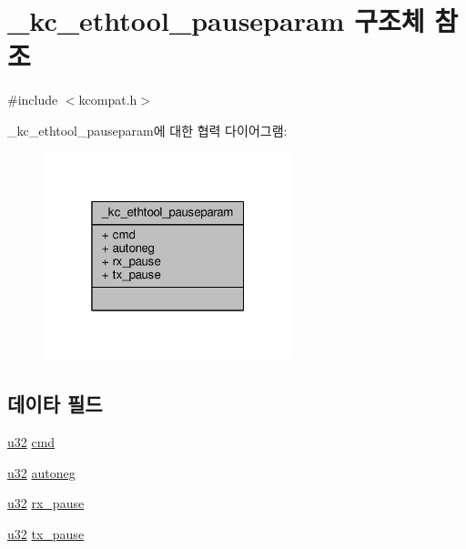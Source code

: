 \hypertarget{struct__kc__ethtool__pauseparam}{}\section{\+\_\+kc\+\_\+ethtool\+\_\+pauseparam 구조체 참조}
\label{struct__kc__ethtool__pauseparam}


{\ttfamily \#include $<$kcompat.\+h$>$}



\+\_\+kc\+\_\+ethtool\+\_\+pauseparam에 대한 협력 다이어그램\+:
\nopagebreak
\begin{figure}[H]
\begin{center}
\leavevmode
\includegraphics[width=205pt]{struct__kc__ethtool__pauseparam__coll__graph}
\end{center}
\end{figure}
\subsection*{데이타 필드}
\begin{DoxyCompactItemize}
\item 
\hyperlink{lib_2igb_2e1000__osdep_8h_a64e91c10a0d8fb627e92932050284264}{u32} \hyperlink{struct__kc__ethtool__pauseparam_a62fe2a1dbf17d5a8561a5a7f5a97a9ba}{cmd}
\item 
\hyperlink{lib_2igb_2e1000__osdep_8h_a64e91c10a0d8fb627e92932050284264}{u32} \hyperlink{struct__kc__ethtool__pauseparam_a4d6e97740e642fae7af06f3f19643305}{autoneg}
\item 
\hyperlink{lib_2igb_2e1000__osdep_8h_a64e91c10a0d8fb627e92932050284264}{u32} \hyperlink{struct__kc__ethtool__pauseparam_a9aa8c27f7cd9d39e92d19d0927e9a1df}{rx\+\_\+pause}
\item 
\hyperlink{lib_2igb_2e1000__osdep_8h_a64e91c10a0d8fb627e92932050284264}{u32} \hyperlink{struct__kc__ethtool__pauseparam_a2d9c3fb4ec1c4ca00f7e7693b11b49c1}{tx\+\_\+pause}
\end{DoxyCompactItemize}


